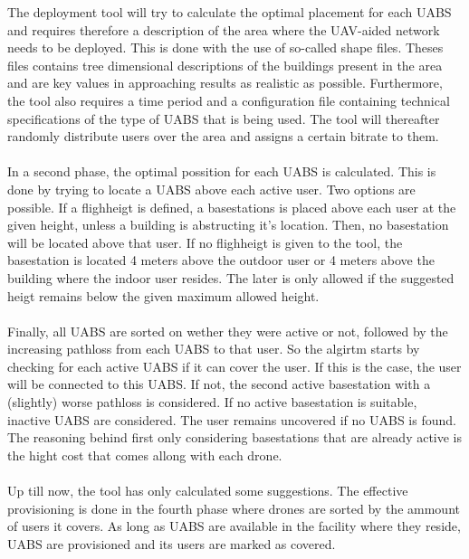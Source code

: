 The deployment tool will try to calculate the optimal placement for each \gls{UABS} and requires therefore a description of the area where the UAV-aided network needs to 
be deployed. This is done with the use of so-called shape files. Theses files contains tree dimensional descriptions of the buildings present in the area and are
key values in approaching results as realistic as possible. Furthermore, the tool also requires a time period and a configuration file containing technical specifications of the type of \gls{UABS} that is being used. 
The tool will thereafter randomly distribute users over the area and assigns a certain bitrate to them. \\
\\
In a second phase, the optimal possition for each \gls{UABS} is calculated. This is done by trying to locate a \gls{UABS} above each active user. Two options are possible.
If a flighheigt is defined, a basestations is placed above each user at the given height, unless a building is abstructing it's location. Then, no basestation will be located above that user.
If no flighheigt is given to the tool, the basestation is located 4 meters above the outdoor user or 4 meters above the building where the indoor user resides. 
The later is only allowed if the suggested heigt remains below the given maximum allowed height. \\
\\
Finally, all  \gls{UABS} are sorted on wether they were active or not, followed by the increasing pathloss from each \gls{UABS} to that user.
So the algirtm starts by checking for each active \gls{UABS} if it can cover the user. If this is the case, the user will be connected to this \gls{UABS}. If not,
the second active basestation with a (slightly) worse pathloss is considered. If no active basestation is suitable, inactive \gls{UABS} are considered. The user remains uncovered if no \gls{UABS}
is found. The reasoning behind first only considering basestations that are already active is the hight cost that comes allong with each drone. \\
\\
Up till now, the tool has only calculated some suggestions. The effective provisioning is done in the fourth phase where drones are sorted by the ammount of users it covers. As long as \gls{UABS}
are available in the facility where they reside, \gls{UABS} are provisioned and its users are marked as covered.


